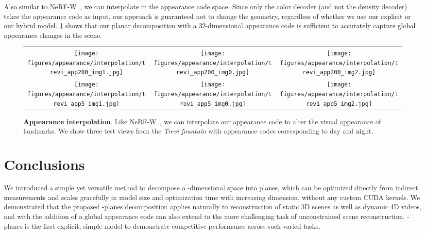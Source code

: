 \documentclass[10pt,twocolumn,letterpaper]{article}
\newcommand{\modelname}{-planes}
\newcommand{\Modelname}{-planes}
\begin{document}
Also similar to NeRF-W~\cite{martinbrualla2020nerfw, Piotr2017latentspaceoptim}, we can interpolate in the appearance code space. Since only the color decoder (and not the density decoder) takes the appearance code as input, our approach is guaranteed not to change the geometry, regardless of whether we use our explicit or our hybrid model. \cref{fig:interpolation} shows that our planar decomposition with a 32-dimensional appearance code is sufficient to accurately capture global appearance changes in the scene.


\newcommand{\figinterpheight}{2.475cm}
\begin{figure}
    \centering
    \begin{tabular}{c@{\hskip 1mm}c@{}@{\hskip 1mm}c@{}}
    \texttt{[image: figures/appearance/interpolation/trevi\_app200\_img1.jpg]} &
    \texttt{[image: figures/appearance/interpolation/trevi\_app200\_img0.jpg]} &
    \texttt{[image: figures/appearance/interpolation/trevi\_app200\_img2.jpg]} \\
    \texttt{[image: figures/appearance/interpolation/trevi\_app5\_img1.jpg]} &
    \texttt{[image: figures/appearance/interpolation/trevi\_app5\_img0.jpg]} &
    \texttt{[image: figures/appearance/interpolation/trevi\_app5\_img2.jpg]}
    \end{tabular} 
    \caption{\textbf{Appearance interpolation}. Like NeRF-W~\cite{martinbrualla2020nerfw}, we can interpolate our appearance code to alter the visual appearance of landmarks. We show three test views from the \emph{Trevi fountain} with appearance codes corresponding to day and night.}
    \label{fig:interpolation}
\end{figure}
 
\section{Conclusions}

We introduced a simple yet versatile method to decompose a -dimensional space into  planes, which can be optimized directly from indirect measurements and scales gracefully in model size and optimization time with increasing dimension, without any custom CUDA kernels. 
We demonstrated that the proposed \modelname{} decomposition applies naturally to reconstruction of static 3D scenes as well as dynamic 4D videos, and with the addition of a global appearance code can also extend to the more challenging task of unconstrained scene reconstruction. \Modelname{} is the first explicit, simple model to demonstrate competitive performance across such varied tasks.
\end{document}
